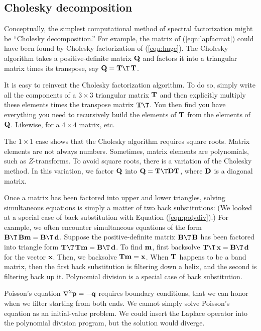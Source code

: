 \subsection{Cholesky decomposition}
Conceptually,
the simplest computational method of spectral factorization
might be ``Cholesky decomposition.''
For example, the matrix of (\ref{eqn:lapfacmat})
could have been found by Cholesky factorization of (\ref{eqn:huge}).
The Cholesky algorithm takes a positive-definite matrix
$\bold Q$ and factors it into a triangular matrix
times its transpose,
say $\bold Q = \bold T\T \, \bold T$.
\par
It is easy to reinvent the Cholesky factorization algorithm.
To do so,
simply write all the components of a $3\times 3$ triangular matrix
$\bold T$ and then explicitly multiply these elements
times the transpose matrix $\bold T\T$.
You then find you have everything you need
to recursively build the elements of $\bold T$
from the elements of $\bold Q$.
Likewise,
for a $4\times 4$ matrix, etc.
\par
The $1\times 1$ case shows that the Cholesky algorithm requires square roots.
Matrix elements are not always numbers.
Sometimes,
matrix elements are polynomials,
such as $Z$-transforms.
To avoid square roots,
there is a variation
of the Cholesky method.
In this variation, we factor $\bold Q$ into
$\bold Q=\bold T\T\bold D\bold T$,
where $\bold D$ is a diagonal matrix.
\par
Once a matrix has been factored into upper and lower triangles,
solving simultaneous equations
is simply a matter of two back substitutions:
(We looked at a special case of back substitution
with Equation
(\ref{eqn:polydiv}).)
For example, we often encounter simultaneous equations of the form
$\bold B\T \, \bold B\bold m=\bold B\T\, \bold d$.
Suppose the positive-definite matrix
$\bold B\T\, \bold B$ has been factored into triangle form
$\bold T\T\, \bold T\bold m=\bold B\T\, \bold d$.
To find 
$\bold m$,
first backsolve
$\bold T\T\, \bold x=\bold B\T\, \bold d$
for the vector
$\bold x$.
Then,
we backsolve
$\bold T\bold m=\bold x$.
When
$\bold T$
happens to be a band matrix,
then the first back substitution is filtering down a helix,
and the second is filtering back up it.
Polynomial division is a special case of back substitution.
\par
Poisson's equation
$\nabla^2 \bold p = -\bold q$
requires boundary conditions,
that we can honor when we filter starting from both ends.
We cannot simply solve Poisson's equation as
an initial-value problem.
We could insert the Laplace operator
into the polynomial division program,
but the solution would diverge.

